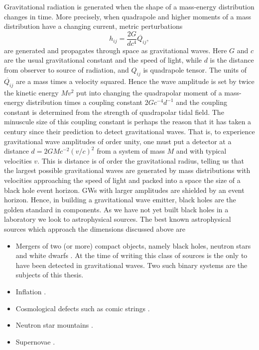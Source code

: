 Gravitational radiation is generated when the shape of a mass-energy distribution changes in time. More precisely, when quadrapole and higher moments of a mass distribution have a changing current, metric perturbations
\begin{equation}
h_{i j} = \frac{2G}{d c^4} \ddot{Q_{ij}},
\end{equation}
are generated and propagates through space as gravitational waves. Here $G$ and $c$ are the usual gravitational constant and the speed of light, while $d$ is the distance from observer to source of radiation, and $Q_{ij}$ is quadrapole tensor. The units of $\ddot{Q_{ij}}$ are a mass times a velocity squared. Hence the wave amplitude is set by twice the kinetic energy $M v^2$ put into changing the quadrapolar moment of a mass-energy distribution times a coupling constant $2 Gc^{-4}d^{-1}$ and the coupling constant is determined from the strength of quadrapolar tidal field. The minuscule size of this coupling constant is perhaps the reason that it has taken a century since their prediction to detect gravitational waves. That is, to experience gravitational wave amplitudes of order unity, one must put a detector at a distance $d= 2GMc^{-2} (v/c)^2$ from a system of mass $M$ and with typical velocities $v$. This is distance is of order the gravitational radius, telling us that the largest possible gravitational waves are generated by mass distributions with velocities approaching the speed of light and packed into a space the size of a black hole event horizon. GWs with larger amplitudes are shielded by an event horizon. Hence, in building a gravitational wave emitter, black holes are the golden standard in components. As we have not yet built black holes in a laboratory we look to astrophysical sources. The best known astrophysical sources which approach the dimensions discussed above are
\begin{itemize}
\item Mergers of two (or more) compact objects, namely black holes, neutron stars and white dwarfs \citep{}. At the time of writing this class of sources is the only to have been detected in gravitational waves\citep{GW091415}. Two such binary systems are the subjects of this thesis.
\item Inflation \citep[\textit{e.g.}][]{Guzzatti:2016}.
\item Cosmological defects such as comic strings  \citep[\textit{e.g.}][]{}.
\item Neutron star mountains  \citep[\textit{e.g.}][]{}.
\item Supernovae  \citep[\textit{e.g.}][]{}.
\end{itemize}


